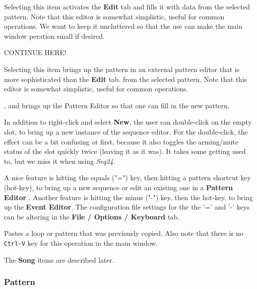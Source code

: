    \setcounter{ItemCounter}{0}      %

   Selecting this item activates the \textbf{Edit} tab and fills it with data
   from the selected pattern.
   Note that this editor is somewhat simplistic, useful for common operations.
   We want to keep it uncluttered so that the use can make the main window
   peration small if desired.

   CONTINUE HERE!


   Selecting this item brings up the pattern in an external pattern editor that
   is more sophisticated than the \textbf{Edit} tab.
   from the selected pattern.
   Note that this editor is somewhat simplistic, useful for common operations.

   , and brings up the Pattern Editor
   so that one can fill in the new pattern.

   In addition to right-click and select \textbf{New}, the user can
   double-click on the empty slot, to bring up a new instance of the sequence
   editor.  For the double-click, the effect can be a bit confusing at first,
   because it also toggles the arming/mute status of the slot
   quickly twice (leaving it as it was).  It takes some getting
   used to, but we miss it when using \textsl{Seq24}.

   A nice feature is hitting the equals ("=") key, then hitting
   a pattern shortcut key (hot-key), to bring up a new sequence or edit an
   existing one in a 
   \textbf{Pattern Editor} .  Another feature is hitting the minus
   ("-") key, then the hot-key, to bring up the \textbf{Event Editor}.
   The configuration file settings for the the '=' and
   '-' keys can be altering in the \textbf{File / Options / Keyboard} tab.

   Pastes a loop or pattern that was previously copied.
   Also note that there is no \texttt{Ctrl-V} key for this operation in the
   main window.

   The \textbf{Song} items are described later.
   
\subsubsection{Pattern}
\label{subsubsec:patterns_pattern_filled}

